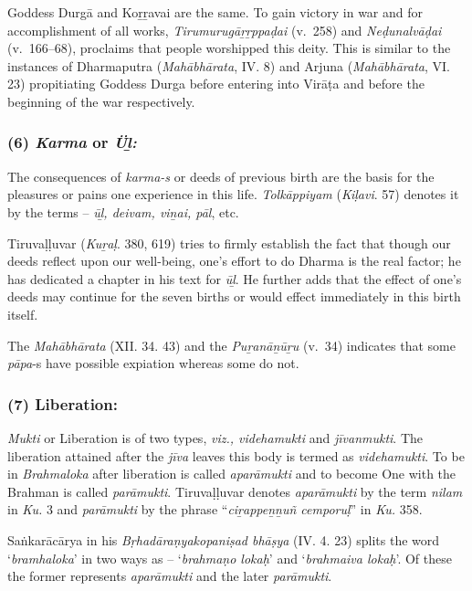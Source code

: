 \vskip -7.5pt

Goddess Durgā and Koṟṟavai are the same. To gain victory in war and for accomplishment of all works, \textit{Tirumurugāṟṟppaḍai} (v.~258) and \textit{Neḍunalvāḍai} (v.~166–68), proclaims that people worshipped this deity. This is similar to the instances of Dharmaputra (\textit{Mahābhārata}, IV. 8) and Arjuna (\textit{Mahābhārata}, VI. 23) propitiating Goddess Durga before entering into Virāṭa and before the beginning of the war respectively.


\subsubsection*{(6) \textit{Karma} or \textit{Üḻ:}}

\vskip -7.5pt

The consequences of \textit{karma-s} or deeds of previous birth are the basis for the pleasures or pains one experience in this life. \textit{Tolkāppiyam} (\textit{Kiḷavi}. 57) denotes it by the terms – \textit{ūḻ, deivam, viṉai, pāl}, etc.

Tiruvaḷḷuvar (\textit{Kuṟaḷ}. 380, 619) tries to firmly establish the fact that though our deeds reflect upon our well-being, one’s effort to do Dharma is the real factor; he has dedicated a chapter in his text for \textit{ūḻ}. He further adds that the effect of one’s deeds may continue for the seven births or would effect immediately in this birth itself.

The \textit{Mahābhārata} (XII. 34. 43) and the \textit{Puṟanāṉūṟu} (v.~34) indicates that some \textit{pāpa}-s have possible expiation whereas some do not.


\subsubsection*{(7) Liberation:}

\vskip -7.5pt

\textit{Mukti} or Liberation is of two types, \textit{viz., videhamukti} and \textit{jīvanmukti}. The liberation attained after the \textit{jīva} leaves this body is termed as \textit{videhamukti}. To be in \textit{Brahmaloka} after liberation is called \textit{aparāmukti} and to become One with the Brahman is called \textit{parāmukti}. Tiruvaḷḷuvar denotes \textit{aparāmukti} by the term \textit{nilam} in \textit{Ku.} 3 and \textit{parāmukti} by the phrase “\textit{ciṟappeṉṉuñ cemporuḷ}” in \textit{Ku.} 358.

Saṅkarācārya in his \textit{Bṛhadāraṇyakopaniṣad bhāṣya} (IV. 4. 23) splits the word ‘\textit{bramhaloka}’ in two ways as – ‘\textit{brahmaṇo lokaḥ}’ and ‘\textit{brahmaiva lokaḥ}’. Of these the former represents \textit{aparāmukti} and the later \textit{parāmukti}.

